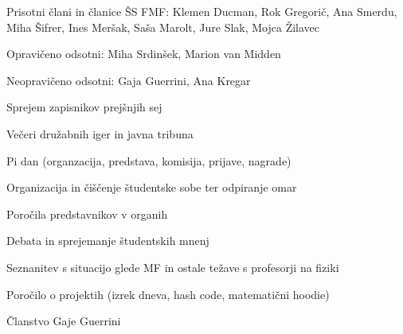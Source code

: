 \documentclass{seja}
\begin{document}
Prisotni člani in članice ŠS FMF: Klemen Ducman, Rok Gregorič, Ana Smerdu, Miha Šifrer, Ines Meršak, Saša Marolt, Jure Slak, Mojca Žilavec

Opravičeno odsotni: Miha Srdinšek, Marion van Midden

Neopravičeno odsotni: Gaja Guerrini, Ana Kregar

\begin{red*}
\item Sprejem zapisnikov prejšnjih sej
\item Večeri družabnih iger in javna tribuna
\item Pi dan (organzacija, predstava, komisija, prijave, nagrade)
\item Organizacija in čiščenje študentske sobe ter odpiranje omar
\item Poročila predstavnikov v organih
\item Debata in sprejemanje študentskih mnenj
\item Seznanitev s situacijo glede MF in ostale težave s profesorji na fiziki
\item Poročilo o projektih (izrek dneva, hash code, matematični hoodie)
\item Članstvo Gaje Guerrini
\end{red*}
\end{document}
